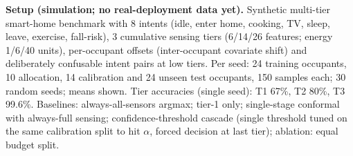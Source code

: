 \documentclass[10pt,a4paper]{article}
\newcommand{\sect}[1]{\par\vspace{5pt}{\bfseries\large #1}\par\vspace{1pt}}
\begin{document}
\sect{8. Experimental validation results}
\textbf{Setup (simulation; no real-deployment data yet).} Synthetic multi-tier smart-home benchmark with 8 intents (idle, enter home, cooking, TV, sleep, leave, exercise, fall-risk), 3 cumulative sensing tiers (6/14/26 features; energy 1/6/40 units), per-occupant offsets (inter-occupant covariate shift) and deliberately confusable intent pairs at low tiers. Per seed: 24 training occupants, 10 allocation, 14 calibration and 24 unseen test occupants, 150 samples each; 30 random seeds; means shown. Tier accuracies (single seed): T1 67\%, T2 80\%, T3 99.6\%. Baselines: always-all-sensors argmax; tier-1 only; single-stage conformal with always-full sensing; confidence-threshold cascade (single threshold tuned on the same calibration split to hit $\alpha$, forced decision at last tier); ablation: equal budget split.
\end{document}
